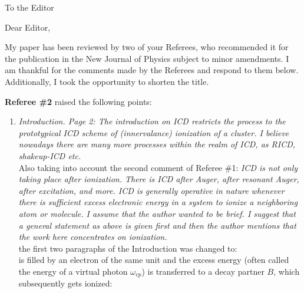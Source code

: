 \documentclass[DIN,pagenumber=false,parskip=half,fromalign=left,fromphone=true,fromemail=true,fromurl=false,fromlogo=false,fromrule=false]{scrlttr2}
\begin{document}
\begin{letter}{To the Editor}
	
	\opening{Dear Editor,}


My paper has been reviewed by two of your Referees,
who recommended it for the publication in the
New Journal of Physics subject to minor amendments.
I am thankful for the comments made by the Referees and
respond to them below. Additionally, I took the opportunity to shorten the title.

\textbf{Referee \#2} raised the following points:

\begin{enumerate}
 \item \emph{Introduction. Page 2:
             The introduction on ICD restricts the process to the prototypical
             ICD scheme of (innervalance) ionization of a cluster. I believe
             nowadays there are many more processes within the realm of ICD,
             as RICD, shakeup-ICD etc.}\\
             Also taking into account the second comment of Referee \#1:
             \emph{ICD is not only taking place after ionization. There is
             ICD after Auger, after resonant Auger, after excitation, and more.
             ICD is generally operative in nature whenever there is sufficient
             excess electronic energy in a system to ionize a neighboring atom
             or molecule. I assume that the author wanted to be brief. I
             suggest that a general statement as above is given first and then
             the author mentions that the work here concentrates on
             ionization.}\\
             the first two paragraphs of the Introduction was changed to:\\
{\color{blue}{The Interatomic Coulombic Decay (ICD) is an electronic decay process of an atom or
molecule with a sub-outer-valence vacancy involving atoms or
molecules of the environment. The decay process is initiated by the creation
of the vacancy, which can be achieved in different ways, out of which
direct ionization, excitation, an Auger decay and radioactive decay are the
most common ones. They are connected to different members of the family
of ICD-like processes such as the Electron Transfer Mediated Decay (ETMD),
the Resonance ICD (RICD), the ICD of multiply charged species like after
an Auger decay and the classical ICD (see Ref. [1, 2]
and references therein).
In this paper the classical ICD of
a sub-outer-valence
vacancy in an atom or a molecule (a unit $A$) will be discussed. After the
creation of the vacancy in $A$, it}} is filled
by an electron of the same unit and the excess energy (often called the energy of
a virtual photon $\omega_{vp}$) is transferred to a decay
partner $B$, which subsequently gets ionized:


\end{enumerate}
\end{letter}
\end{document}

